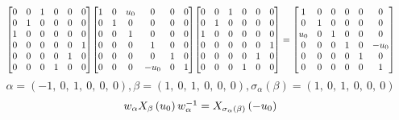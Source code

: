 \documentclass[11pt]{article}
\theoremstyle{definition}
\begin{document}
\[
\scaletoalign{\textwidth}{{\left[\begin{matrix}0 & 0 & 1 & 0 & 0 & 0\\0 & 1 & 0 & 0 & 0 & 0\\1 & 0 & 0 & 0 & 0 & 0\\0 & 0 & 0 & 0 & 0 & 1\\0 & 0 & 0 & 0 & 1 & 0\\0 & 0 & 0 & 1 & 0 & 0\end{matrix}\right]} {\left[\begin{matrix}1 & 0 & u_{0} & 0 & 0 & 0\\0 & 1 & 0 & 0 & 0 & 0\\0 & 0 & 1 & 0 & 0 & 0\\0 & 0 & 0 & 1 & 0 & 0\\0 & 0 & 0 & 0 & 1 & 0\\0 & 0 & 0 & - u_{0} & 0 & 1\end{matrix}\right]} {\left[\begin{matrix}0 & 0 & 1 & 0 & 0 & 0\\0 & 1 & 0 & 0 & 0 & 0\\1 & 0 & 0 & 0 & 0 & 0\\0 & 0 & 0 & 0 & 0 & 1\\0 & 0 & 0 & 0 & 1 & 0\\0 & 0 & 0 & 1 & 0 & 0\end{matrix}\right]} = {\left[\begin{matrix}1 & 0 & 0 & 0 & 0 & 0\\0 & 1 & 0 & 0 & 0 & 0\\u_{0} & 0 & 1 & 0 & 0 & 0\\0 & 0 & 0 & 1 & 0 & - u_{0}\\0 & 0 & 0 & 0 & 1 & 0\\0 & 0 & 0 & 0 & 0 & 1\end{matrix}\right]}}
\]
\[
\alpha = \left( -1, \  0, \  1, \  0, \  0, \  0\right), \beta = \left( 1, \  0, \  1, \  0, \  0, \  0\right), \sigma_{\alpha}(\beta) = \left( 1, \  0, \  1, \  0, \  0, \  0\right)
\]
\[
\scaletoalign{\textwidth}{w_{\alpha} X_{\beta}\left(u_{0}\right) w_{\alpha}^{-1} = X_{\sigma_{\alpha}\left(\beta\right)}\left(- u_{0}\right)}
\]
\end{document}

